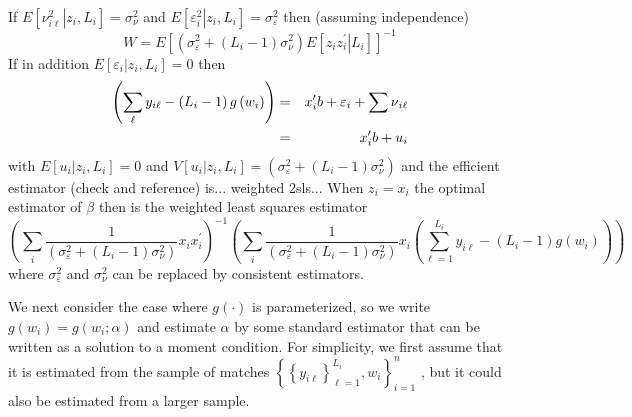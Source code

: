 \documentclass[12pt]{article}
\begin{document}
If $E\left[ \left. \nu _{i\ell }^{2}\right\vert z_{i},L_{i}\right] =\sigma
_{\nu }^{2}$ and $E\left[ \left. \varepsilon _{i}^{2}\right\vert z_{i},L_{i}%
\right] =\sigma _{\varepsilon }^{2}$ then (assuming independence)
\begin{equation*}
W=E\left[ \left( \sigma _{\varepsilon }^{2}+\left( L_{i}-1\right) \sigma
_{\nu }^{2}\right) E\left[ \left. z_{i}z_{i}^{\prime }\right\vert L_{i}%
\right] \right] ^{-1}
\end{equation*}%
If in addition $E\left[ \left. \varepsilon _{i}\right\vert z_{i},L_{i}\right]
=0$ then
\begin{eqnarray*}
\left( \sum_{\ell }y_{i\ell }-\left( L_{i}-1\right) g\left( w_{i}\right)
\right) &=&x_{i}^{\prime }b+\varepsilon _{i}+\dsum \nu _{i\ell } \\
&=&x_{i}^{\prime }b+u_{i}
\end{eqnarray*}%
with $E\left[ \left. u_{i}\right\vert z_{i},L_{i}\right] =0$ and $V\left[
\left. u_{i}\right\vert z_{i},L_{i}\right] =\left( \sigma _{\varepsilon
}^{2}+\left( L_{i}-1\right) \sigma _{\nu }^{2}\right) $ and the efficient
estimator (check and reference) is... weighted 2sls... When $z_{i}=x_{i}$
the optimal estimator of $\beta $ then is the weighted least squares
estimator
\begin{equation*}
\left( \sum_{i}\frac{1}{\left( \sigma _{\varepsilon }^{2}+\left(
L_{i}-1\right) \sigma _{\nu }^{2}\right) }x_{i}x_{i}^{\prime }\right)
^{-1}\left( \sum_{i}\frac{1}{\left( \sigma _{\varepsilon }^{2}+\left(
L_{i}-1\right) \sigma _{\nu }^{2}\right) }x_{i}\left( \sum_{\ell
=1}^{L_{i}}y_{i\ell }-\left( L_{i}-1\right) g\left( w_{i}\right) \right)
\right)
\end{equation*}%
where $\sigma _{\varepsilon }^{2}$ and $\sigma _{\nu }^{2}$ can be replaced
by consistent estimators.

We next consider the case where $g\left( \cdot \right) $ is parameterized,
so we write $g\left( w_{i}\right) =g\left( w_{i};\alpha \right) $ and
estimate $\alpha $ by some standard estimator that can be written as a
solution to a moment condition. For simplicity, we first assume that it is
estimated from the sample of matches $\left\{ \left\{ y_{i\ell }\right\}
_{\ell =1}^{L_{i}},w_{i}\right\} _{i=1}^{n}$ , but it could also be
estimated from a larger sample.
\end{document}
